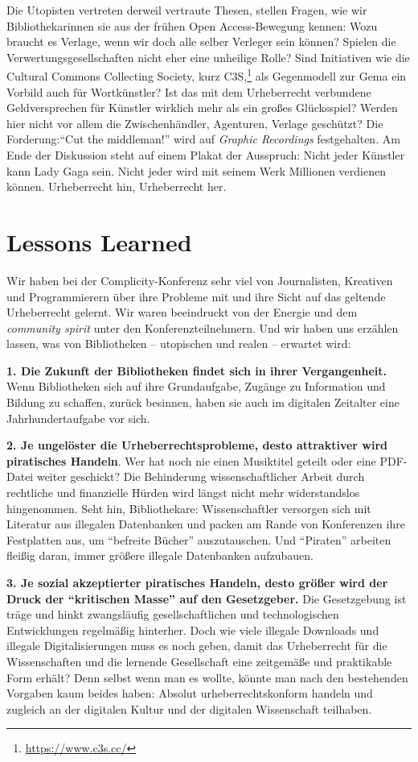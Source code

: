 \documentclass[a4paper,
fontsize=11pt,
oneside,
numbers=noperiodatend,
parskip=half-,
bibliography=totoc,
final
]{scrartcl}
\begin{document}
Die Utopisten vertreten derweil vertraute Thesen, stellen Fragen, wie
wir Bibliothekarinnen sie aus der frühen Open Access-Bewegung kennen:
Wozu braucht es Verlage, wenn wir doch alle selber Verleger sein können?
Spielen die Verwertungsgesellschaften nicht eher eine unheilige Rolle?
Sind Initiativen wie die Cultural Commons Collecting Society, kurz
C3S,\footnote{\url{https://www.c3s.cc/}} als Gegenmodell zur Gema ein
Vorbild auch für Wortkünstler? Ist das mit dem Urheberrecht verbundene
Geldversprechen für Künstler wirklich mehr als ein großes Glücksspiel?
Werden hier nicht vor allem die Zwischenhändler, Agenturen, Verlage
geschützt? Die Forderung:\enquote{Cut the middleman!} wird auf
\emph{Graphic Recordings} festgehalten. Am Ende der Diskussion steht auf
einem Plakat der Ausspruch: Nicht jeder Künstler kann Lady Gaga sein.
Nicht jeder wird mit seinem Werk Millionen verdienen können.
Urheberrecht hin, Urheberrecht her.

\section*{Lessons Learned}\label{lessons-learned}

Wir haben bei der Complicity-Konferenz sehr viel von Journalisten,
Kreativen und Programmierern über ihre Probleme mit und ihre Sicht auf
das geltende Urheberrecht gelernt. Wir waren beeindruckt von der Energie
und dem \emph{community spirit} unter den Konferenzteilnehmern. Und wir
haben uns erzählen lassen, was von Bibliotheken -- utopischen und realen
-- erwartet wird:

\textbf{1. Die Zukunft der Bibliotheken findet sich in ihrer
Vergangenheit.} Wenn Bibliotheken sich auf ihre Grundaufgabe, Zugänge zu
Information und Bildung zu schaffen, zurück besinnen, haben sie auch im
digitalen Zeitalter eine Jahrhundertaufgabe vor sich.

\textbf{2. Je ungelöster die Urheberrechtsprobleme, desto attraktiver
wird piratisches Handeln}. Wer hat noch nie einen Musiktitel geteilt
oder eine PDF-Datei weiter geschickt? Die Behinderung wissenschaftlicher
Arbeit durch rechtliche und finanzielle Hürden wird längst nicht mehr
widerstandslos hingenommen. Seht hin, Bibliothekare: Wissenschaftler
versorgen sich mit Literatur aus illegalen Datenbanken und packen am
Rande von Konferenzen ihre Festplatten aus, um \enquote{befreite Bücher}
auszutauschen. Und \enquote{Piraten} arbeiten fleißig daran, immer
größere illegale Datenbanken aufzubauen.

\textbf{3. Je sozial akzeptierter piratisches Handeln, desto größer wird
der Druck der \enquote{kritischen Masse} auf den Gesetzgeber.} Die
Gesetzgebung ist träge und hinkt zwangsläufig gesellschaftlichen und
technologischen Entwicklungen regelmäßig hinterher. Doch wie viele
illegale Downloads und illegale Digitalisierungen muss es noch geben,
damit das Urheberrecht für die Wissenschaften und die lernende
Gesellschaft eine zeitgemäße und praktikable Form erhält? Denn selbst
wenn man es wollte, könnte man nach den bestehenden Vorgaben kaum beides
haben: Absolut urheberrechtskonform handeln und zugleich an der
digitalen Kultur und der digitalen Wissenschaft teilhaben.
\end{document}
